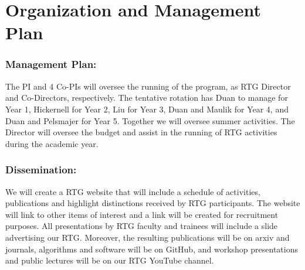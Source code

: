 \documentclass[11pt]{NSFamsart}
\begin{document}
\section{Organization and Management Plan }
 

 
\subsubsection*{Management Plan:}
 The PI and 4 Co-PIs will oversee the running of the program, as RTG Director  and Co-Directors, respectively.  The tentative rotation has Duan to manage for Year 1, Hickernell for Year 2,    Liu for  Year 3,    Duan and Maulik for Year 4, and Duan and Pelsmajer for Year 5.   Together we     will oversee summer activities.  
The Director will oversee
the budget and assist in the running of RTG activities during the academic year. 


 \subsubsection*{Dissemination:} 
 We will create a   RTG website that will include a schedule of activities, publications and highlight
distinctions received by RTG participants. The website will link to other items of interest and a link will
be created for recruitment purposes. All presentations by RTG faculty and trainees  will    include a slide advertising our RTG.
Moreover, the resulting publications   will be on arxiv and journals, algorithms and software will be on GitHub, and workshop  presentations and  public lectures will be on our RTG YouTube channel.

 
\end{document}
